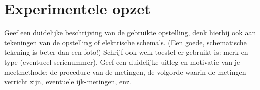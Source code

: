 \section{Experimentele opzet}
Geef een duidelijke beschrijving van de gebruikte opstelling, denk hierbij ook aan tekeningen
van de opstelling of elektrische schema’s. (Een goede, schematische tekening is beter dan een
foto!) Schrijf ook welk toestel er gebruikt is: merk en type (eventueel serienummer).
Geef een duidelijke uitleg en motivatie van je meetmethode: de procedure van de metingen, de
volgorde waarin de metingen verricht zijn, eventuele ijk-metingen, enz.